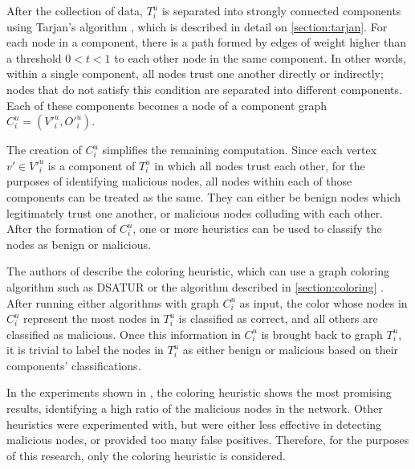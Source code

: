 \documentclass[conference]{IEEEtran}
\begin{document}
After the collection of data, $T^u_i$ is separated into strongly connected components using Tarjan's algorithm \cite{tarjan1972depth}, which is described in detail on \autoref{section:tarjan}.
For each node in a component, there is a path formed by edges of weight higher than a threshold $0 < t < 1$ to each other node in the same component.
In other words, within a single component, all nodes trust one another directly or indirectly; nodes that do not satisfy this condition are separated into different components.
Each of these components becomes a node of a component graph $C^u_i = (V'^u_i, O'^u_i)$.

The creation of $C^u_i$ simplifies the remaining computation.
Since each vertex $v' \in V'^u_i$ is a component of $T^u_i$ in which all nodes trust each other, for the purposes of identifying malicious nodes, all nodes within each of those components can be treated as the same.
They can either be benign nodes which legitimately trust one another, or malicious nodes colluding with each other.
After the formation of $C^u_i$, one or more heuristics can be used to classify the nodes as benign or malicious.

The authors of \cite{vernize2015malicious} describe the coloring heuristic, which can use a graph coloring algorithm such as DSATUR \cite{brelaz1979new} or the algorithm described in \autoref{section:coloring} \cite{mittal2011graph}.
After running either algorithms with graph $C^u_i$ as input, the color whose nodes in $C^u_i$ represent the most nodes in $T^u_i$ is classified as correct, and all others are classified as malicious.
Once this information in $C^u_i$ is brought back to graph $T^u_i$, it is trivial to label the nodes in $T^u_i$ as either benign or malicious based on their components' classifications.

In the experiments shown in \cite{vernize2013dissertation}, the coloring heuristic shows the most promising results, identifying a high ratio of the malicious nodes in the network.
Other heuristics were experimented with, but were either less effective in detecting malicious nodes, or provided too many false positives.
Therefore, for the purposes of this research, only the coloring heuristic is considered.

%
\end{document}
